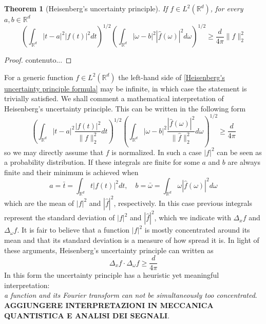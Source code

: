 \documentclass[corpo=11pt, stile=classica, tipotesi=custom,
greek, evenboxes, english]{toptesi}
\numberwithin{equation}{chapter}
\newtheorem{teo}{Theorem}[chapter] %
\newcommand{\R}{\mathbb{R}} %
\begin{document}
\begin{teo}[Heisenberg's uncertainty principle]\label{Heisenberg's uncertainty principle theorem}
	If $f \in L^2(\R^d)$, for every $a,b \in \R^d$
	\begin{equation}\label{Heisenberg's uncertainty principle formula}
		\left(\int_{\R^d}|t-a|^2 |f(t)|^2 dt\right)^{1/2} \left(\int_{\R^d} |\omega-b|^2 |\hat{f}(\omega)|^2 d\omega\right)^{1/2} \geq \dfrac{d}{4\pi}\| f \|_2^2
	\end{equation}
\end{teo}
\begin{proof}
	contenuto...
\end{proof}
For a generic function $f \in L^2(\R^d)$ the left-hand side of \eqref{Heisenberg's uncertainty principle formula} may be infinite, in which case the statement is trivially satisfied. {\color{blue}We shall comment a mathematical interpretation of Heisenberg's uncertainty principle. This can be written in the following form
\begin{equation*}
	\left(\int_{\R^d}|t-a|^2 \dfrac{|f(t)|^2}{\|f\|_2^2} dt\right)^{1/2} \left(\int_{\R^d} |\omega-b|^2 \dfrac{|\hat{f}(\omega)|^2}{\|\hat{f}\|_2^2}d\omega\right)^{1/2} \geq \dfrac{d}{4\pi}
\end{equation*}
so we may directly assume that $f$ is normalized. In such a case $|f|^2$ can be seen as a probability distribution. If these integrals are finite for some $a$ and $b$ are always finite and their minimum is achieved when
\begin{equation*}
	a = \bar{t} = \int_{\R^d} t |f(t)|^2 dt, \quad b = \bar{\omega} = \int_{\R^d} \omega |\hat{f}(\omega)|^2 d\omega
\end{equation*}
which are the mean of $|f|^2$ and $|\hat{f}|^2$, respectively. In this case previous integrals represent the standard deviation of $|f|^2$ and $|\hat{f}|^2$, which we indicate with $\Delta_x f$ and $\Delta_{\omega} f$. It is fair to believe that a function $|f|^2$ is mostly concentrated around its mean and that its standard deviation is a measure of how spread it is. In light of these arguments, Heisenberg's uncertainty principle can written as
\begin{equation*}
	\Delta_x f \cdot \Delta_{\omega} f \geq \dfrac{d}{4\pi}
\end{equation*}
In this form the uncertainty principle has a heuristic yet meaningful interpretation:\\
\emph{a function and its Fourier transform can not be simultaneously too concentrated}.\\
\textbf{AGGIUNGERE INTERPRETAZIONI IN MECCANICA QUANTISTICA E ANALISI DEI SEGNALI}.}
\end{document}
